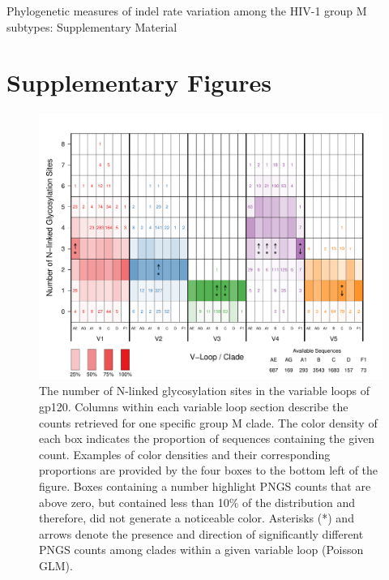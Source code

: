 \documentclass[12pt]{article}
\newcommand{\todo}[2]{\hl{\textbf{#1:} #2}}
\begin{document}
\begin{flushleft}

\baselineskip 24pt

{\Large Phylogenetic measures of indel rate variation among the HIV-1 group M subtypes: Supplementary Material}  %

\end{flushleft}


\section * {Supplementary Figures}

\setcounter{table}{0}
\renewcommand\thetable{S\arabic{table}} 


\setcounter{figure}{0}
\renewcommand\thefigure{S\arabic{figure}} 


\begin{figure}[htbp]
    \centering
    \includegraphics[width=.95\textwidth, trim={5mm, 0mm, 12mm, 15mm}, clip]{pngs-totals}
    \caption{The number of N-linked glycosylation sites in the variable loops of gp120.	
    Columns within each variable loop section describe the counts retrieved for one specific group M clade. 
    The color density of each box indicates the proportion of sequences containing the given count. 
    Examples of color densities and their corresponding proportions are provided by the four boxes to the bottom left of the figure.  
	Boxes containing a number highlight PNGS counts that are above zero, but contained less than 10\% of the distribution and therefore, did not generate a noticeable color.
    Asterisks (*) and arrows denote the presence and direction of significantly different PNGS counts among clades within a given variable loop (Poisson GLM).
    }
    \label{pngs-totals}
\end{figure}
\end{document}

